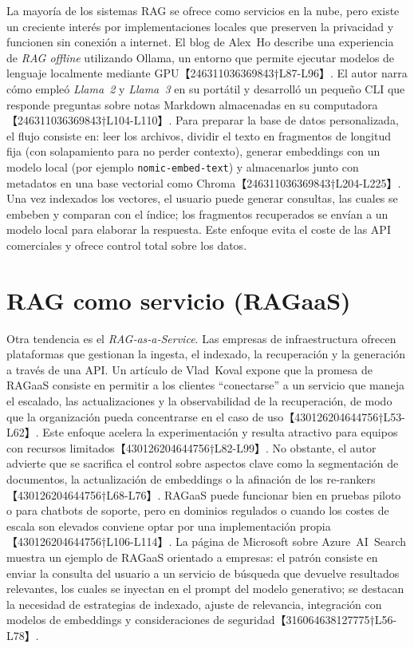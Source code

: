 La mayoría de los sistemas RAG se ofrece como servicios en la nube, pero existe un creciente interés por implementaciones locales que preserven la privacidad y funcionen sin conexión a internet.  El blog de Alex Ho describe una experiencia de \emph{RAG offline} utilizando Ollama, un entorno que permite ejecutar modelos de lenguaje localmente mediante GPU【246311036369843†L87-L96】.  El autor narra cómo empleó \textit{Llama 2} y \textit{Llama 3} en su portátil y desarrolló un pequeño CLI que responde preguntas sobre notas Markdown almacenadas en su computadora【246311036369843†L104-L110】.  Para preparar la base de datos personalizada, el flujo consiste en: leer los archivos, dividir el texto en fragmentos de longitud fija (con solapamiento para no perder contexto), generar embeddings con un modelo local (por ejemplo \texttt{nomic‑embed‑text}) y almacenarlos junto con metadatos en una base vectorial como Chroma【246311036369843†L204-L225】.  Una vez indexados los vectores, el usuario puede generar consultas, las cuales se embeben y comparan con el índice; los fragmentos recuperados se envían a un modelo local para elaborar la respuesta.  Este enfoque evita el coste de las API comerciales y ofrece control total sobre los datos.

\section{RAG como servicio (RAGaaS)}

Otra tendencia es el \textit{RAG‑as‑a‑Service}.  Las empresas de infraestructura ofrecen plataformas que gestionan la ingesta, el indexado, la recuperación y la generación a través de una API.  Un artículo de Vlad Koval expone que la promesa de RAGaaS consiste en permitir a los clientes ``conectarse'' a un servicio que maneja el escalado, las actualizaciones y la observabilidad de la recuperación, de modo que la organización pueda concentrarse en el caso de uso【430126204644756†L53-L62】.  Este enfoque acelera la experimentación y resulta atractivo para equipos con recursos limitados【430126204644756†L82-L99】.  No obstante, el autor advierte que se sacrifica el control sobre aspectos clave como la segmentación de documentos, la actualización de embeddings o la afinación de los re‑rankers【430126204644756†L68-L76】.  RAGaaS puede funcionar bien en pruebas piloto o para chatbots de soporte, pero en dominios regulados o cuando los costes de escala son elevados conviene optar por una implementación propia【430126204644756†L106-L114】.  La página de Microsoft sobre Azure AI Search muestra un ejemplo de RAGaaS orientado a empresas: el patrón consiste en enviar la consulta del usuario a un servicio de búsqueda que devuelve resultados relevantes, los cuales se inyectan en el prompt del modelo generativo; se destacan la necesidad de estrategias de indexado, ajuste de relevancia, integración con modelos de embeddings y consideraciones de seguridad【316064638127775†L56-L78】.

